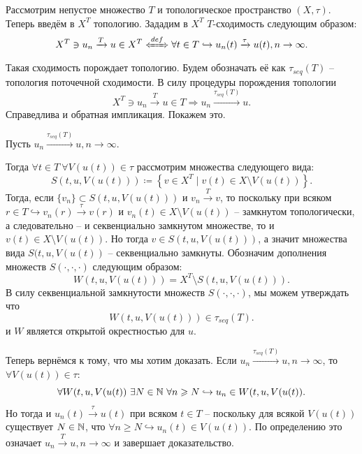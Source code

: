 \begin{example}
    Рассмотрим непустое множество $T$ и топологическое пространство $(X, \tau)$.
    Теперь введём в $X^T$ топологию.
    Зададим в $X^T$ $T$-сходимость следующим образом:
    \[X^T \ni u_n \xrightarrow{T} u \in X^T \xLeftrightarrow{def} \forall t \in T \hookrightarrow u_n(t) \xrightarrow{\tau} u(t), n \rightarrow \infty.\]
    Такая сходимость порождает топологию.
    Будем обозначать её как $\tau_{seq}(T)$ -- топология поточечной сходимости.
    В силу процедуры порождения топологии
    \[
        X^T \ni u_n \xrightarrow{T} u \in T \Rightarrow u_n \xrightarrow{\tau_{seq}(T)} u.
    \]
    Справедлива и обратная импликация.
    Покажем это.

    Пусть $u_n \xrightarrow{\tau_{seq}(T)} u, n \rightarrow \infty$.

    Тогда $\forall t \in T \ \forall V(u(t)) \in \tau$ рассмотрим множества следующего вида:
    \[
        S(t, u, V(u(t))) \coloneq \left\{v \in X^T \mid v(t) \in X \setminus V(u(t))\right\}.
    \]
    Тогда, если $\{v_n\} \subset S(t, u, V(u(t)))$ и $v_n \xrightarrow{T} v$, то поскольку при всяком $r \in T \hookrightarrow v_n(r) \xrightarrow{\tau} v(r)$ и $v_n(t) \in X \setminus V(u(t))$ -- замкнутом топологически, а следовательно -- и секвенциально замкнутом множестве, то и $v(t) \in X \setminus V(u(t))$.
    Но тогда $v \in S(t, u, V(u(t)))$, а значит множества вида $S(t, u, V(u(t))$ -- секвенциально замкнуты.
    Обозначим дополнения множеств $S(\cdot, \cdot, \cdot)$ следующим образом:
    \[
        W(t, u, V(u(t))) = X^T \setminus S(t, u, V(u(t))).
    \]
    В силу секвенциальной замкнутости множеств $S(\cdot, \cdot, \cdot)$, мы можем утверждать что \[W(t, u, V(u(t))) \in \tau_{seq}(T).\] и $W$ является открытой окрестностью для $u$.

    Теперь вернёмся к тому, что мы хотим доказать.
    Если $u_n \xrightarrow{\tau_{seq}(T)} u, n \rightarrow \infty$, то $\forall V(u(t)) \in \tau\colon$
    \[
        \forall W(t, u, V(u(t)) \ \exists N \in \mathbb{N} \ \forall n \geqslant N \hookrightarrow u_n \in W(t, u, V(u(t)).
    \]
    Но тогда и $u_n(t) \xrightarrow{\tau} u(t)$ при всяком $t \in T$ -- поскольку для всякой $V(u(t))$ существует $N \in \mathbb{N}$, что $\forall n \geq N \hookrightarrow u_n(t) \in V(u(t))$.
    По определению это означает $u_n \xrightarrow{T} u, n \rightarrow \infty$ и завершает доказательство.
\end{example}
